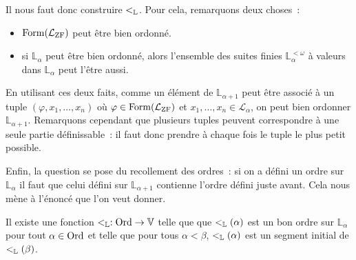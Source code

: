 Il nous faut donc construire $<_{\mathbb L}$. Pour cela, remarquons deux choses~:
\begin{itemize}
\item $\operatorname{Form}(\mathcal L_{\operatorname{ZF}})$ peut être bien ordonné.
\item si $\mathbb L_\alpha$ peut être bien ordonné, alors l'ensemble des
  suites finies $\mathbb L_\alpha^{<\omega}$ à valeurs dans $\mathbb L_\alpha$
  peut l'être aussi.
\end{itemize}
En utilisant ces deux faits, comme un élément de $\mathbb L_{\alpha + 1}$
peut être associé à un tuple $(\varphi,x_1,\ldots,x_n)$ où
$\varphi\in\operatorname{Form}(\mathcal L_{\operatorname{ZF}})$ et $x_1,\ldots,x_n \in\mathcal L_{\alpha}$,
on peut bien ordonner $\mathbb L_{\alpha + 1}$. Remarquons cependant que
plusieurs tuples peuvent correspondre à une seule partie définissable~: il faut
donc prendre à chaque fois le tuple le plus petit possible.

Enfin, la question se pose du recollement des ordres~: si on a défini un ordre
sur $\mathbb L_\alpha$ il faut que celui défini sur $\mathbb L_{\alpha + 1}$
contienne l'ordre défini juste avant. Cela nous mène à l'énoncé que l'on veut
donner.

\begin{theorem}
  Il existe une fonction $<_{\mathbb L} : \operatorname{Ord} \to \mathbb V$ telle que que
  $<_{\mathbb L}(\alpha)$ est un bon ordre sur $\mathbb L_\alpha$ pour tout
  $\alpha\in \operatorname{Ord}$ et telle que pour tous $\alpha < \beta$,
  $<_{\mathbb L}(\alpha)$ est un segment initial de $<_{\mathbb L}(\beta)$.
\end{theorem}

